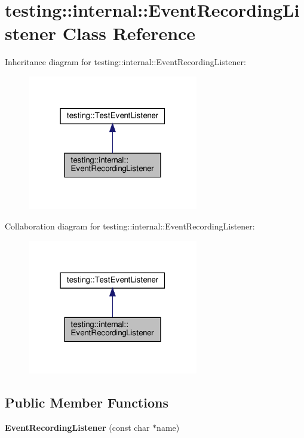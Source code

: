 \hypertarget{classtesting_1_1internal_1_1_event_recording_listener}{}\section{testing\+:\+:internal\+:\+:Event\+Recording\+Listener Class Reference}
\label{classtesting_1_1internal_1_1_event_recording_listener}


Inheritance diagram for testing\+:\+:internal\+:\+:Event\+Recording\+Listener\+:
\nopagebreak
\begin{figure}[H]
\begin{center}
\leavevmode
\includegraphics[width=211pt]{classtesting_1_1internal_1_1_event_recording_listener__inherit__graph}
\end{center}
\end{figure}


Collaboration diagram for testing\+:\+:internal\+:\+:Event\+Recording\+Listener\+:
\nopagebreak
\begin{figure}[H]
\begin{center}
\leavevmode
\includegraphics[width=211pt]{classtesting_1_1internal_1_1_event_recording_listener__coll__graph}
\end{center}
\end{figure}
\subsection*{Public Member Functions}
\begin{DoxyCompactItemize}
\item 
\mbox{\label{classtesting_1_1internal_1_1_event_recording_listener_a7b0254c15d6b8468e1441ee572fee707}} 
{\bfseries Event\+Recording\+Listener} (const char $\ast$name)
\end{DoxyCompactItemize}
